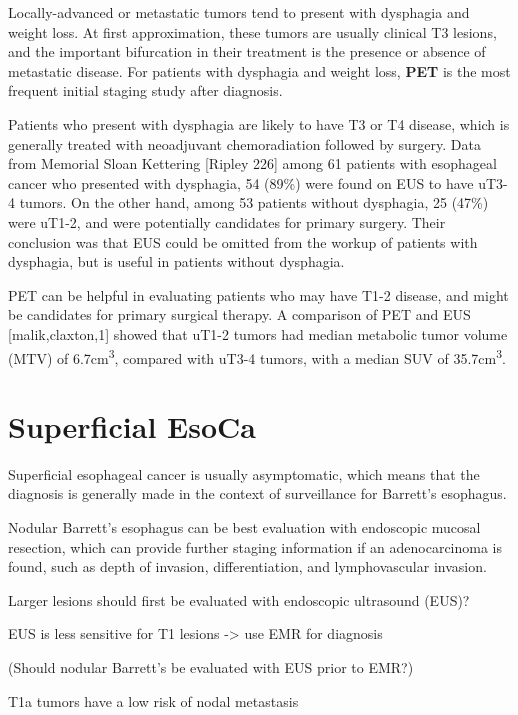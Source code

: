 \documentclass[
]{book}
\begin{document}
Locally-advanced or metastatic tumors tend to present with dysphagia and weight loss. At first approximation, these tumors are usually clinical T3 lesions, and the important bifurcation in their treatment is the presence or absence of metastatic disease. For patients with dysphagia and weight loss, \textbf{PET} is the most frequent initial staging study after diagnosis.

Patients who present with dysphagia are likely to have T3 or T4 disease, which is generally treated with neoadjuvant chemoradiation followed by surgery. Data from Memorial Sloan Kettering {[}Ripley 226{]} among 61 patients with esophageal cancer who presented with dysphagia, 54 (89\%) were found on EUS to have uT3-4 tumors. On the other hand, among 53 patients without dysphagia, 25 (47\%) were uT1-2, and were potentially candidates for primary surgery. Their conclusion was that EUS could be omitted from the workup of patients with dysphagia, but is useful in patients without dysphagia.

PET can be helpful in evaluating patients who may have T1-2 disease, and might be candidates for primary surgical therapy. A comparison of PET and EUS {[}malik,claxton,1{]} showed that uT1-2 tumors had median metabolic tumor volume (MTV) of 6.7cm\textsuperscript{3}, compared with uT3-4 tumors, with a median SUV of 35.7cm\textsuperscript{3}.

\hypertarget{superficial}{%
\chapter{Superficial EsoCa}\label{superficial}}

Superficial esophageal cancer is usually asymptomatic, which means that the diagnosis is generally made in the context of surveillance for Barrett's esophagus.

Nodular Barrett's esophagus can be best evaluation with endoscopic mucosal resection, which can provide further staging information if an adenocarcinoma is found, such as depth of invasion, differentiation, and lymphovascular invasion.

Larger lesions should first be evaluated with endoscopic ultrasound (EUS)?

EUS is less sensitive for T1 lesions \citep{bergeron765} -\textgreater{} use EMR for diagnosis \citep{maish1777}

(Should nodular Barrett's be evaluated with EUS prior to EMR?)

T1a tumors have a low risk of nodal metastasis \citep{dunbar850}
\end{document}
